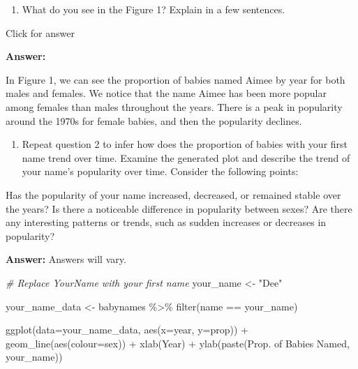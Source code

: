 \documentclass[
]{book}
\newenvironment{Shaded}{\begin{snugshade}}{\end{snugshade}}
\newcommand{\AttributeTok}[1]{\textcolor[rgb]{0.77,0.63,0.00}{#1}}
\newcommand{\CommentTok}[1]{\textcolor[rgb]{0.56,0.35,0.01}{\textit{#1}}}
\newcommand{\FunctionTok}[1]{\textcolor[rgb]{0.00,0.00,0.00}{#1}}
\newcommand{\NormalTok}[1]{#1}
\newcommand{\OtherTok}[1]{\textcolor[rgb]{0.56,0.35,0.01}{#1}}
\newcommand{\SpecialCharTok}[1]{\textcolor[rgb]{0.00,0.00,0.00}{#1}}
\newcommand{\StringTok}[1]{\textcolor[rgb]{0.31,0.60,0.02}{#1}}
\providecommand{\tightlist}{%
  \setlength{\itemsep}{0pt}\setlength{\parskip}{0pt}}
\begin{document}
\begin{enumerate}
\def\labelenumi{\arabic{enumi}.}
\setcounter{enumi}{1}
\tightlist
\item
  What do you see in the Figure 1? Explain in a few sentences.
\end{enumerate}

Click for answer

\textbf{Answer:}

In Figure 1, we can see the proportion of babies named Aimee by year for both males and females. We notice that the name Aimee has been more popular among females than males throughout the years. There is a peak in popularity around the 1970s for female babies, and then the popularity declines.

\begin{enumerate}
\def\labelenumi{\arabic{enumi}.}
\setcounter{enumi}{2}
\tightlist
\item
  Repeat question 2 to infer how does the proportion of babies with your first name trend over time. Examine the generated plot and describe the trend of your name's popularity over time. Consider the following points:
\end{enumerate}

Has the popularity of your name increased, decreased, or remained stable over the years? Is there a noticeable difference in popularity between sexes? Are there any interesting patterns or trends, such as sudden increases or decreases in popularity?

\textbf{Answer:} Answers will vary.

\vspace*{0.2in}

\begin{Shaded}
\begin{Highlighting}[]
\CommentTok{\# Replace \textquotesingle{}YourName\textquotesingle{} with your first name}
\NormalTok{your\_name }\OtherTok{\textless{}{-}} \StringTok{"Dee"}

\NormalTok{your\_name\_data }\OtherTok{\textless{}{-}}\NormalTok{ babynames }\SpecialCharTok{\%\textgreater{}\%} \FunctionTok{filter}\NormalTok{(name }\SpecialCharTok{==}\NormalTok{ your\_name)}

\FunctionTok{ggplot}\NormalTok{(}\AttributeTok{data=}\NormalTok{your\_name\_data, }\FunctionTok{aes}\NormalTok{(}\AttributeTok{x=}\NormalTok{year, }\AttributeTok{y=}\NormalTok{prop)) }\SpecialCharTok{+} 
  \FunctionTok{geom\_line}\NormalTok{(}\FunctionTok{aes}\NormalTok{(}\AttributeTok{colour=}\NormalTok{sex)) }\SpecialCharTok{+} 
  \FunctionTok{xlab}\NormalTok{(}\StringTok{\textquotesingle{}Year\textquotesingle{}}\NormalTok{) }\SpecialCharTok{+} 
  \FunctionTok{ylab}\NormalTok{(}\FunctionTok{paste}\NormalTok{(}\StringTok{\textquotesingle{}Prop. of Babies Named\textquotesingle{}}\NormalTok{, your\_name))}
\end{Highlighting}
\end{Shaded}
\end{document}
